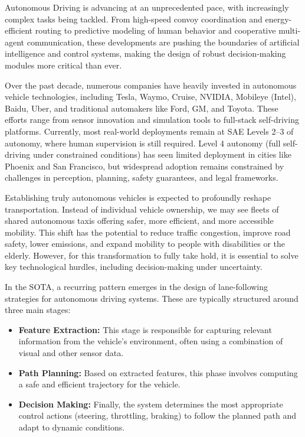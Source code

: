 \documentclass[]{interact}
\begin{document}
Autonomous Driving is advancing at an unprecedented pace, with increasingly complex tasks being tackled. From high-speed convoy coordination and energy-efficient routing to predictive modeling of human behavior and cooperative multi-agent communication, these developments are pushing the boundaries of artificial intelligence and control systems, making the design of robust decision-making modules more critical than ever.

Over the past decade, numerous companies have heavily invested in autonomous vehicle technologies, including Tesla, Waymo, Cruise, NVIDIA, Mobileye (Intel), Baidu, Uber, and traditional automakers like Ford, GM, and Toyota. These efforts range from sensor innovation and simulation tools to full-stack self-driving platforms. Currently, most real-world deployments remain at SAE Levels 2–3 of autonomy, where human supervision is still required. Level 4 autonomy (full self-driving under constrained conditions) has seen limited deployment in cities like Phoenix and San Francisco, but widespread adoption remains constrained by challenges in perception, planning, safety guarantees, and legal frameworks.

Establishing truly autonomous vehicles is expected to profoundly reshape transportation. Instead of individual vehicle ownership, we may see fleets of shared autonomous taxis offering safer, more efficient, and more accessible mobility. This shift has the potential to reduce traffic congestion, improve road safety, lower emissions, and expand mobility to people with disabilities or the elderly. However, for this transformation to fully take hold, it is essential to solve key technological hurdles, including decision-making under uncertainty.

In the SOTA, a recurring pattern emerges in the design of lane-following strategies for autonomous driving systems. These are typically structured around three main stages:

\begin{itemize}
 \item \textbf{Feature Extraction:} This stage is responsible for capturing relevant information from the vehicle’s environment, often using a combination of visual and other sensor data.
 \item \textbf{Path Planning:} Based on extracted features, this phase involves computing a safe and efficient trajectory for the vehicle.
 \item \textbf{Decision Making:} Finally, the system determines the most appropriate control actions (steering, throttling, braking) to follow the planned path and adapt to dynamic conditions.
\end{itemize}
\end{document}
